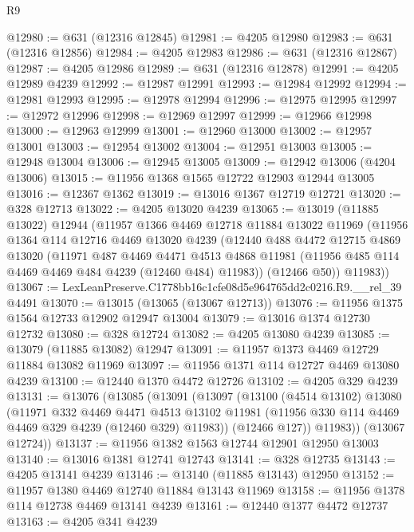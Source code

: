 \begin{lexlean}{R9}
\begin{coremodule}
@12980 := @631 (@12316 @12845)
@12981 := @4205 @12980
@12983 := @631 (@12316 @12856)
@12984 := @4205 @12983
@12986 := @631 (@12316 @12867)
@12987 := @4205 @12986
@12989 := @631 (@12316 @12878)
@12991 := @4205 @12989 @4239
@12992 := @12987 @12991
@12993 := @12984 @12992
@12994 := @12981 @12993
@12995 := @12978 @12994
@12996 := @12975 @12995
@12997 := @12972 @12996
@12998 := @12969 @12997
@12999 := @12966 @12998
@13000 := @12963 @12999
@13001 := @12960 @13000
@13002 := @12957 @13001
@13003 := @12954 @13002
@13004 := @12951 @13003
@13005 := @12948 @13004
@13006 := @12945 @13005
@13009 := @12942 @13006 (@4204 @13006)
@13015 := @11956 @1368 @1565 @12722 @12903 @12944 @13005
@13016 := @12367 @1362
@13019 := @13016 @1367 @12719 @12721
@13020 := @328 @12713
@13022 := @4205 @13020 @4239
@13065 := @13019
    (@11885 @13022)
    @12944
    (@11957
      @1366
      @4469
      @12718
      @11884
      @13022
      @11969
      (@11956
        @1364
        @114
        @12716
        @4469
        @13020
        @4239
        (@12440
          @488
          @4472
          @12715
          @4869
          @13020
          (@11971
            @487
            @4469
            @4471
            @4513
            @4868
            @11981
            (@11956 @485 @114 @4469 @4469 @484 @4239 (@12460 @484) @11983))
          (@12466 @50))
        @11983))
@13067 := LexLeanPreserve.C1778bb16c1cfe08d5e964765dd2c0216.R9.__rel_39 @4491
@13070 := @13015 (@13065 (@13067 @12713))
@13076 := @11956 @1375 @1564 @12733 @12902 @12947 @13004
@13079 := @13016 @1374 @12730 @12732
@13080 := @328 @12724
@13082 := @4205 @13080 @4239
@13085 := @13079 (@11885 @13082) @12947
@13091 := @11957 @1373 @4469 @12729 @11884 @13082 @11969
@13097 := @11956 @1371 @114 @12727 @4469 @13080 @4239
@13100 := @12440 @1370 @4472 @12726
@13102 := @4205 @329 @4239
@13131 := @13076
    (@13085
      (@13091
        (@13097
          (@13100
            (@4514 @13102)
            @13080
            (@11971
              @332
              @4469
              @4471
              @4513
              @13102
              @11981
              (@11956 @330 @114 @4469 @4469 @329 @4239 (@12460 @329) @11983))
            (@12466 @127))
          @11983))
      (@13067 @12724))
@13137 := @11956 @1382 @1563 @12744 @12901 @12950 @13003
@13140 := @13016 @1381 @12741 @12743
@13141 := @328 @12735
@13143 := @4205 @13141 @4239
@13146 := @13140 (@11885 @13143) @12950
@13152 := @11957 @1380 @4469 @12740 @11884 @13143 @11969
@13158 := @11956 @1378 @114 @12738 @4469 @13141 @4239
@13161 := @12440 @1377 @4472 @12737
@13163 := @4205 @341 @4239

\end{coremodule}
\end{lexlean}
